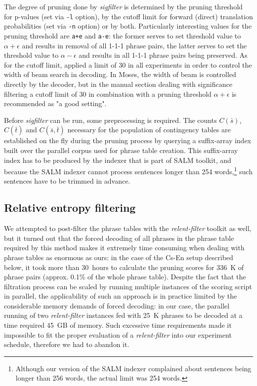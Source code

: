The degree of pruning done by \emph{sigfilter} is determined by the pruning
threshold for p-values (set via \verb|-l| option), by the cutoff limit for forward
(direct) translation probabilities (set via \verb|-n| option) or by both.
Particularly interesting values for the pruning threshold are \verb|a+e| and
\verb|a-e|: the former serves to set threshold value to $\alpha + \epsilon$ and
results in removal of all 1-1-1 phrase pairs, the latter serves to set the threshold
value to $\alpha - \epsilon$ and results in all 1-1-1 phrase pairs being preserved.
As for the cutoff limit, \citet{johnson:sigfilter} applied a limit of 30 in all
experiments in order to control the width of beam search in decoding.
In Moses, the width of beam is controlled directly by the decoder, but
in the manual section dealing with significance filtering a cutoff limit of 30
in combination with a pruning threshold $\alpha + \epsilon$ is recommended as
"a good setting".

Before \emph{sigfilter} can be run, some preprocessing is required.
The counts $C(\bar{s})$, $C(\bar{t})$ and $C(\bar{s},\bar{t})$ necessary for
the population of contingency tables are established on the fly during the
pruning process by querying a suffix-array index built over the parallel
corpus used for phrase table creation.
This suffix-array index has to be produced by the indexer that is part of SALM
toolkit,
and because the SALM indexer cannot process sentences longer than 254 words,\footnote{Although
our version of the SALM indexer complained about sentences being longer than 256 words,
the actual limit was 254 words.} such sentences have to be trimmed in advance.

\subsection{Relative entropy filtering}

We attempted to post-filter the phrase tables with the \emph{relent-filter} toolkit as well,
but it turned out that the forced decoding of all phrases in the phrase table required by this
method makes it extremely time consuming when dealing with phrase tables as enormous as ours:
in the case of the Cs-En setup described below, it took more than 30~hours to calculate the pruning
scores for 336~K of phrase pairs (approx. 0.1\% of the whole phrase table).
Despite the fact that the filtration process can be scaled by running multiple
instances of the scoring script in parallel, the applicability of such an approach is in practice
limited by the considerable memory demands of forced decoding: in our case, the parallel running of
two \emph{relent-filter} instances fed with 25~K phrases to be decoded at a time required
45~GB of memory.
Such excessive time requirements made it impossible to fit the proper evaluation of
a \emph{relent-filter} into our experiment schedule, therefore we had to abandon it.

